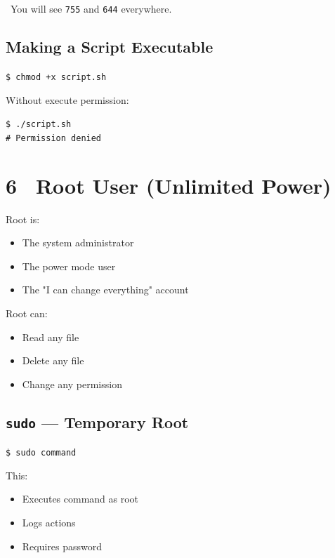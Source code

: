 \documentclass[12pt]{article}
\newcommand{\rooticon}{\faUserShield}
\newcommand{\handicon}{\faHandPointRight}
\begin{document}
\begin{infobox}
\handicon\ You will see \texttt{755} and \texttt{644} everywhere.
\end{infobox}

\subsection*{Making a Script Executable}

\begin{highlightbox}
\texttt{\$ chmod +x script.sh}
\end{highlightbox}

Without execute permission:

\begin{highlightbox}
\texttt{\$ ./script.sh}\\
\texttt{\# Permission denied}
\end{highlightbox}

\section*{6 \rooticon\ Root User (Unlimited Power)}

Root is:

\begin{itemize}
    \item The system administrator
    \item The power mode user
    \item The "I can change everything" account
\end{itemize}

Root can:

\begin{itemize}
    \item Read any file
    \item Delete any file
    \item Change any permission
\end{itemize}

\subsection*{\texttt{sudo} — Temporary Root}

\begin{highlightbox}
\texttt{\$ sudo command}
\end{highlightbox}

This:

\begin{itemize}
    \item Executes command as root
    \item Logs actions
    \item Requires password
\end{itemize}
\end{document}
